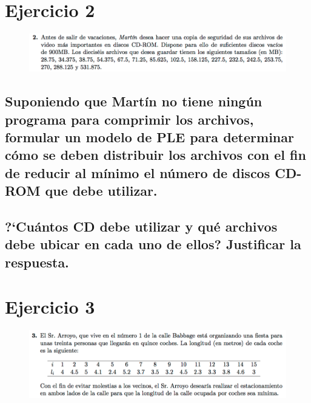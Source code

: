 \documentclass[10pt, a4paper]{article}
\begin{document}
			\paragraph{}


	\section{Ejercicio 2}

        \begin{figure}[H]
        \centering
            \includegraphics[width=\textwidth]{res/exercise-2.png}
        \end{figure}


		\subsection{Suponiendo que Martín no tiene ningún programa para comprimir los archivos, formular un modelo de PLE para determinar cómo se deben distribuir los archivos con el fin de reducir al mínimo el número de discos CD-ROM que debe utilizar.}

			\paragraph{}

		\subsection{?`Cuántos CD debe utilizar y qué archivos debe ubicar en cada uno de ellos? Justificar la respuesta.}

			\paragraph{}


	\section{Ejercicio 3}

        \begin{figure}[H]
        \centering
            \includegraphics[width=\textwidth]{res/exercise-3.png}
        \end{figure}
\end{document}
